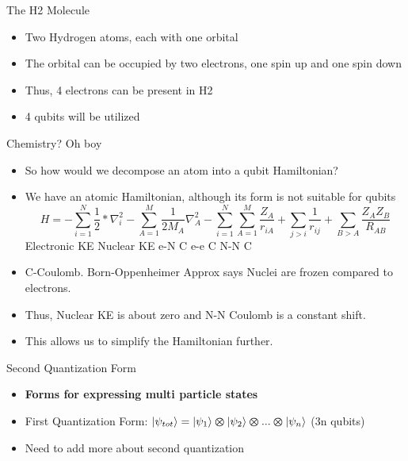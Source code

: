 \begin{frame}{The H2 Molecule}
    \begin{itemize}
        \item Two Hydrogen atoms, each with one orbital
        \item The orbital can be occupied by two electrons, one spin up and one spin down
        \item Thus, 4 electrons can be present in H2
        \item 4 qubits will be utilized
    \end{itemize}
\end{frame}

\begin{frame}{Chemistry? Oh boy}
    \begin{itemize}
        \item So how would we decompose an atom into a qubit Hamiltonian?
        \item We have an atomic Hamiltonian, although its form is not suitable for qubits
        \[H = -\sum_{i=1}^N{\frac{1}{2}*\nabla_i^2 - \sum_{A=1}^M{\frac{1}{2M_A}\nabla_A^2} - \sum_{i=1}^N{\sum_{A=1}^M{\frac{Z_A}{r_{iA}}}}} + \sum_{j>i}{\frac{1}{r_{ij}}} + \sum_{B>A}{\frac{Z_AZ_B}{R_{AB}}}
        \]
        \quad \quad Electronic KE \quad \quad Nuclear KE \quad \quad e-N C \quad \quad \quad e-e C \quad \quad  N-N C 
        \item C-Coulomb. Born-Oppenheimer Approx says Nuclei are frozen compared to electrons.
        \item Thus, Nuclear KE is about zero and N-N Coulomb is a constant shift.
        \item This allows us to simplify the Hamiltonian further.
    \end{itemize}
\end{frame}
\begin{frame}{Second Quantization Form}
    \begin{itemize}
        \item \textbf{Forms for expressing multi particle states}
        \item First Quantization Form: $|\psi_{tot}\rangle = |\psi_1\rangle\bm{\otimes}|\psi_2\rangle\bm{\otimes}...\bm{\otimes}|\psi_n\rangle$ (3n qubits)
        \item Need to add more about second quantization 
    \end{itemize}
\end{frame}


